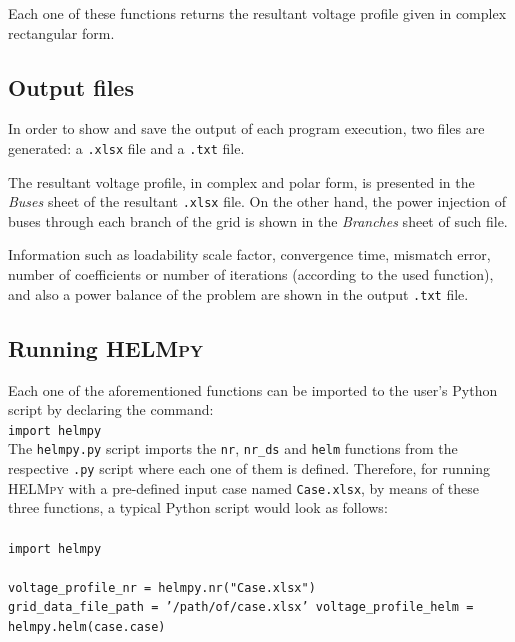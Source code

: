 \documentclass[12pt]{article}
\begin{document}
Each one of these functions returns the resultant voltage profile given in complex rectangular form.


\subsection{Output files}
In order to show and save the output of each program execution, two files are generated: a \texttt{.xlsx} file and a \texttt{.txt} file.

The resultant voltage profile, in complex and polar form, is presented in the \textit{Buses} sheet of the resultant \texttt{.xlsx} file. On the other hand, the power injection of buses through each branch of the grid is shown in the \textit{Branches} sheet of such file.

Information such as loadability scale factor, convergence time, mismatch error, number of coefficients or number of iterations (according to the used function), and also a power balance of the problem are shown in the output \texttt{.txt} file.

\subsection{Running \textsc{HELMpy}}
Each one of the aforementioned functions can be imported to the user’s Python script by declaring the command:
\newline \\
%
\hspace*{5mm} \texttt{import helmpy}\\

The \texttt{helmpy.py} script imports the \texttt{nr}, \texttt{nr_ds} and \texttt{helm} functions from the respective \texttt{.py} script where each one of them is defined. Therefore, for running \textsc{HELMpy} with a pre-defined input case named \texttt{Case.xlsx}, by means of these three functions, a typical Python script would look as follows: \\ \\
%
\hspace*{5mm} \texttt{import helmpy\\\\
\hspace*{5mm} voltage_profile_nr = helmpy.nr("Case.xlsx")\\
\hspace*{5mm} grid_data_file_path = '/path/of/case.xlsx'
\hspace*{5mm} voltage_profile_helm = helmpy.helm(case.case)\\}
\end{document}
